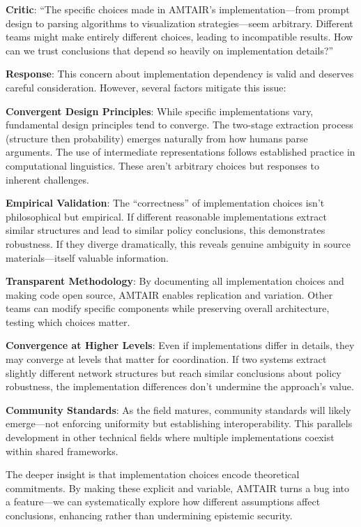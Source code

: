 \documentclass[
  11pt,
  letterpaper,
]{book}
\begin{document}
\textbf{Critic}: ``The specific choices made in AMTAIR's
implementation---from prompt design to parsing algorithms to
visualization strategies---seem arbitrary. Different teams might make
entirely different choices, leading to incompatible results. How can we
trust conclusions that depend so heavily on implementation details?''

\textbf{Response}: This concern about implementation dependency is valid
and deserves careful consideration. However, several factors mitigate
this issue:

\textbf{Convergent Design Principles}: While specific implementations
vary, fundamental design principles tend to converge. The two-stage
extraction process (structure then probability) emerges naturally from
how humans parse arguments. The use of intermediate representations
follows established practice in computational linguistics. These aren't
arbitrary choices but responses to inherent challenges.

\textbf{Empirical Validation}: The ``correctness'' of implementation
choices isn't philosophical but empirical. If different reasonable
implementations extract similar structures and lead to similar policy
conclusions, this demonstrates robustness. If they diverge dramatically,
this reveals genuine ambiguity in source materials---itself valuable
information.

\textbf{Transparent Methodology}: By documenting all implementation
choices and making code open source, AMTAIR enables replication and
variation. Other teams can modify specific components while preserving
overall architecture, testing which choices matter.

\textbf{Convergence at Higher Levels}: Even if implementations differ in
details, they may converge at levels that matter for coordination. If
two systems extract slightly different network structures but reach
similar conclusions about policy robustness, the implementation
differences don't undermine the approach's value.

\textbf{Community Standards}: As the field matures, community standards
will likely emerge---not enforcing uniformity but establishing
interoperability. This parallels development in other technical fields
where multiple implementations coexist within shared frameworks.

The deeper insight is that implementation choices encode theoretical
commitments. By making these explicit and variable, AMTAIR turns a bug
into a feature---we can systematically explore how different assumptions
affect conclusions, enhancing rather than undermining epistemic
security.
\end{document}
